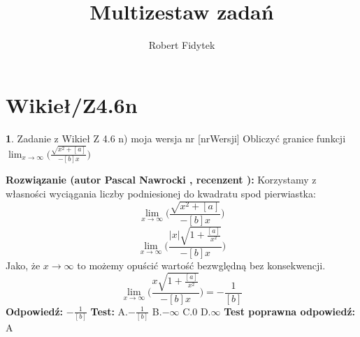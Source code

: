 \documentclass[12pt, a4paper]{article}
\title{Multizestaw zadań}
\author{Robert Fidytek}
\date{}
\theoremstyle{definition} %
\newtheorem{zad}{}
\newcommand{\kategoria}[1]{\section{#1}} %
\newcommand{\zadStart}[1]{\begin{zad}#1\newline} %
\newcommand{\zadStop}{\end{zad}}   %
\newcommand{\rozwStart}[2]{\noindent \textbf{Rozwiązanie (autor #1 , recenzent #2): }\newline} %
\newcommand{\rozwStop}{\newline}                                            %
\newcommand{\odpStart}{\noindent \textbf{Odpowiedź:}\newline}    %
\newcommand{\odpStop}{\newline}                                             %
\newcommand{\testStart}{\noindent \textbf{Test:}\newline} %
\newcommand{\testStop}{\newline} %
\newcommand{\kluczStart}{\noindent \textbf{Test poprawna odpowiedź:}\newline} %
\newcommand{\kluczStop}{\newline} %
\begin{document}
\maketitle


\kategoria{Wikieł/Z4.6n}
\zadStart{Zadanie z Wikieł Z 4.6 n) moja wersja nr [nrWersji]}
Obliczyć granice funkcji $\displaystyle{\lim_{x \to \infty}}\bigg(\frac{\sqrt{x^2+[a]}}{-[b]x}\bigg)$
\zadStop
\rozwStart{Pascal Nawrocki}{}
Korzystamy z własności wyciągania liczby podniesionej do kwadratu spod pierwiastka:
$$\displaystyle{\lim_{x \to \infty}}\bigg(\frac{\sqrt{x^2+[a]}}{-[b]x}\bigg)$$
$$\displaystyle{\lim_{x \to \infty}}\bigg(\frac{|x|\sqrt{1+\frac{[a]}{x^2}}}{-[b]x}\bigg)$$
Jako, że $x \to \infty$ to możemy opuścić wartość bezwględną bez konsekwencji.
$$\displaystyle{\lim_{x \to \infty}}\bigg(\frac{x\sqrt{1+\frac{[a]}{x^2}}}{-[b]x}\bigg)=-\frac{1}{[b]}$$
\rozwStop
\odpStart
$-\frac{1}{[b]}$
\odpStop
\testStart
A.$-\frac{1}{[b]}$
B.$-\infty$
C.$0$
D.$\infty$
\testStop
\kluczStart
A
\kluczStop
\end{document}
